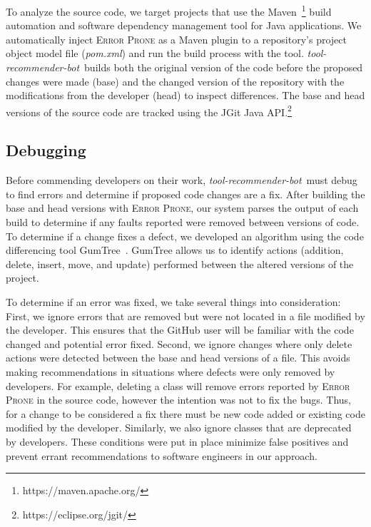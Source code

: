 \documentclass[sigconf,review,anonymous]{acmart}
\newcommand{\tool}{\textsl{tool-recommender-bot}}
\begin{document}
To analyze the source code, we target projects that use the Maven~\footnote{https://maven.apache.org/} build automation and software dependency management tool for Java applications. We automatically inject \textsc{Error Prone} as a Maven plugin to a repository's project object model file (\textit{pom.xml}) and run the build process with the tool. \tool~builds both the original version of the code before the proposed changes were made (base) and the changed version of the repository with the modifications from the developer (head) to inspect differences. The base and head versions of the source code are tracked using the JGit Java API.\footnote{https://eclipse.org/jgit/}

\subsection{Debugging}

Before commending developers on their work, \tool~must debug to find errors and determine if proposed code changes are a fix. After building the base and head versions with \textsc{Error Prone}, our system parses the output of each build to determine if any faults reported were removed between versions of code. To determine if a change fixes a defect, we developed an algorithm using the code differencing tool GumTree~\cite{GumTree}. GumTree allows us to identify actions (addition, delete, insert, move, and update) performed between the altered versions of the project. 

To determine if an error was fixed, we take several things into consideration: First, we ignore errors that are removed but were not located in a file modified by the developer. This ensures that the GitHub user will be familiar with the code changed and potential error fixed. Second, we ignore changes where only delete actions were detected between the base and head versions of a file. This avoids making recommendations in situations where defects were only removed by developers. For example, deleting a class will remove errors reported by \textsc{Error Prone} in the source code, however the intention was not to fix the bugs. Thus, for a change to be considered a fix there must be new code added or existing code modified by the developer. Similarly, we also ignore classes that are deprecated by developers. These conditions were put in place minimize false positives and prevent errant recommendations to software engineers in our approach.
\end{document}
